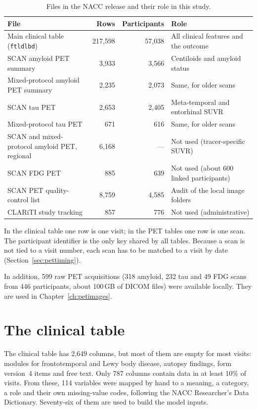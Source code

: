 \begin{table}[H]
\centering\small
\caption{Files in the NACC release and their role in this study.}
\label{tab:files}
\begin{tabularx}{\textwidth}{@{}lrrY@{}}
\toprule
File & Rows & Participants & Role \\
\midrule
Main clinical table (\texttt{ftldlbd}) & 217,598 & 57,038 & All clinical features and the outcome \\
SCAN amyloid PET summary & 3,933 & 3,566 & Centiloids and amyloid status \\
Mixed-protocol amyloid PET summary & 2,235 & 2,073 & Same, for older scans \\
SCAN tau PET & 2,653 & 2,405 & Meta-temporal and entorhinal SUVR \\
Mixed-protocol tau PET & 671 & 616 & Same, for older scans \\
SCAN and mixed-protocol amyloid PET, regional & 6,168 & --- & Not used (tracer-specific SUVR) \\
SCAN FDG PET & 885 & 639 & Not used (about 600 linked participants) \\
SCAN PET quality-control list & 8,759 & 4,585 & Audit of the local image folders \\
CLARiTI study tracking & 857 & 776 & Not used (administrative) \\
\bottomrule
\end{tabularx}
\end{table}

In the clinical table one row is one visit; in the PET tables one row is one scan. The participant identifier is the only key shared by all tables. Because a scan is not tied to a visit number, each scan has to be matched to a visit by date (Section~\ref{sec:pettiming}).

In addition, 599 raw PET acquisitions (318 amyloid, 232 tau and 49 FDG scans from 446 participants, about 100\,GB of DICOM files) were available locally. They are used in Chapter~\ref{ch:petimages}.

\section{The clinical table}

The clinical table has 2,649 columns, but most of them are empty for most visits: modules for frontotemporal and Lewy body disease, autopsy findings, form version~4 items and free text. Only 787 columns contain data in at least 10\% of visits. From these, 114 variables were mapped by hand to a meaning, a category, a role and their own missing-value codes, following the NACC Researcher's Data Dictionary. Seventy-six of them are used to build the model inputs.

